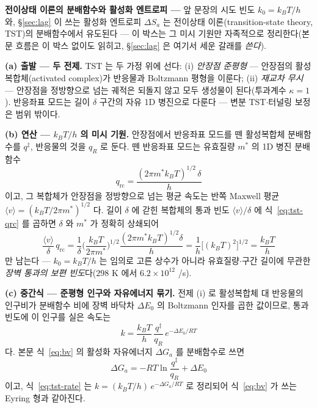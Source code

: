 \begin{bgbox}
\textbf{전이상태 이론의 분배함수와 활성화 엔트로피 ---} 앞 문장의 시도 빈도 $k_0=k_BT/h$ 와,
\S\ref{sec:lag} 이 쓰는 활성화 엔트로피 $\Delta S_a$ 는 전이상태 이론(transition-state theory, TST)의
분배함수에서 유도된다 --- 이 박스는 그 미시 기원만 자족적으로 정리한다(본문 흐름은 이 박스 없이도 읽히고,
\S\ref{sec:lag} 은 여기서 세운 갈래를 \emph{쓴다}).

\textbf{(a) 출발 --- 두 전제.} TST 는 두 가정 위에 선다: (i) \emph{안장점 준평형} --- 안장점의
활성복합체(activated complex)가 반응물과 Boltzmann 평형을 이룬다; (ii) \emph{재교차 무시} --- 안장점을
정방향으로 넘는 궤적은 되돌지 않고 모두 생성물이 된다(투과계수 $\kappa=1$)\cite{laidlerking1983}. 반응좌표
모드는 길이 $\delta$ 구간의 자유 1D 병진으로 다룬다 --- 변분 TST$\cdot$터널링 보정은 범위 밖이다.

\textbf{(b) 연산 --- $k_BT/h$ 의 미시 기원.} 안장점에서 반응좌표 모드를 뗀 활성복합체 분배함수를
$q^{\ddagger}$, 반응물의 것을 $q_R$ 로 둔다. 뗀 반응좌표 모드는 유효질량 $m^{*}$ 의 1D 병진 분배함수
\begin{equation}
q_\mathrm{rc}=\frac{(2\pi m^{*}k_BT)^{1/2}\,\delta}{h}
\label{eq:tst-qrc}
\end{equation}
이고, 그 복합체가 안장점을 정방향으로 넘는 평균 속도는 반쪽 Maxwell 평균
$\langle v\rangle=(k_BT/2\pi m^{*})^{1/2}$ 다. 길이 $\delta$ 에 갇힌 복합체의 통과 빈도 $\langle v\rangle/\delta$ 에
식~\eqref{eq:tst-qrc} 를 곱하면 $\delta$ 와 $m^{*}$ 가 정확히 상쇄되어
\begin{equation}
\frac{\langle v\rangle}{\delta}\,q_\mathrm{rc}
=\frac{1}{\delta}\Big(\frac{k_BT}{2\pi m^{*}}\Big)^{1/2}\frac{(2\pi m^{*}k_BT)^{1/2}\delta}{h}
=\frac{1}{h}\big[(k_BT)^2\big]^{1/2}
=\frac{k_BT}{h}
\label{eq:tst-freq}
\end{equation}
만 남는다 --- $k_0=k_BT/h$ 는 임의로 고른 상수가 아니라 유효질량$\cdot$구간 길이에 무관한 \emph{장벽 통과의
보편 빈도}다($298$ K 에서 $6.2\times10^{12}$ /s).

\textbf{(c) 중간식 --- 준평형 인구와 자유에너지 묶기.} 전제 (i) 로 활성복합체 대 반응물의 인구비가
분배함수 비에 장벽 바닥차 $\Delta E_0$ 의 Boltzmann 인자를 곱한 값이므로, 통과 빈도에 이 인구를 실은
속도는
\begin{equation}
k=\frac{k_BT}{h}\,\frac{q^{\ddagger}}{q_R}\,e^{-\Delta E_0/RT}
\label{eq:tst-rate}
\end{equation}
다\cite{glasstone1941,mcquarrie1976}. 본문 식~\eqref{eq:bv} 의 활성화 자유에너지 $\Delta G_a$ 를 분배함수로
쓰면
\begin{equation}
\Delta G_a=-RT\ln\frac{q^{\ddagger}}{q_R}+\Delta E_0
\label{eq:tst-dG}
\end{equation}
이고, 식~\eqref{eq:tst-rate} 는 $k=(k_BT/h)\,e^{-\Delta G_a/RT}$ 로 정리되어 식~\eqref{eq:bv} 가 쓰는 Eyring
형과 같아진다.


\end{bgbox}
